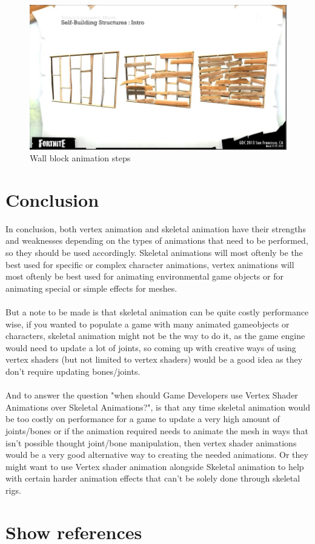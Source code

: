 \documentclass{scrartcl}
\begin{document}
\begin{figure}[h!]
  \centering
  \includegraphics[scale=0.5]{wallimg.jpg}
  \caption{Wall block animation steps}
  \label{fig:wall}
\end{figure}

\section{Conclusion}
In conclusion, both vertex animation and skeletal animation have their strengths and weaknesses depending on the types of animations that need to be performed, so they should be used accordingly. Skeletal animations will most oftenly be the best used for specific or complex character animations, vertex animations will most oftenly be best used for animating environmental game objects or for animating special or simple effects for meshes.
\\~\\
But a note to be made is that skeletal animation can be quite costly performance wise, if you wanted to populate a game with many animated gameobjects or characters, skeletal animation might not be the way to do it, as the game engine would need to update a lot of joints, so coming up with creative ways of using vertex shaders (but not limited to vertex shaders) would be a good idea as they don't require updating bones/joints.
\\~\\
And to answer the question "when should Game Developers use Vertex Shader Animations over Skeletal Animations?", is that any time skeletal animation would be too costly on performance for a game to update a very high amount of joints/bones or if the animation required needs to animate the mesh in ways that isn't possible thought joint/bone manipulation, then vertex shader animations would be a very good alternative way to creating the needed animations. Or they might want to use Vertex shader animation alongside Skeletal animation to help with certain harder animation effects that can't be solely done through skeletal rigs.

\section{Show references}
\cite{one}\cite{two}\cite{three}\cite{four}\cite{five}\cite{six}\cite{seven}\cite{nine}\cite{ten}\cite{eleven}\cite{twelve}\cite{thirteen}


\end{document}
